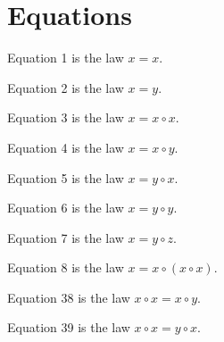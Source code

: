 \chapter{Equations}

\begin{definition}[Equation 1]\label{eq1}\leanok{}  Equation 1 is the law $x=x$.
\end{definition}

\begin{definition}[Equation 2]\label{eq2}\leanok{}  Equation 2 is the law $x=y$.
\end{definition}

\begin{definition}[Equation 3]\label{eq3}\leanok{}  Equation 3 is the law $x=x \circ x$.
\end{definition}

\begin{definition}[Equation 4]\label{eq4}\leanok{}  Equation 4 is the law $x=x \circ y$.
\end{definition}

\begin{definition}[Equation 5]\label{eq5}\leanok{}  Equation 5 is the law $x=y \circ x$.
\end{definition}

\begin{definition}[Equation 6]\label{eq6}\leanok{}  Equation 6 is the law $x=y \circ y$.
\end{definition}

\begin{definition}[Equation 7]\label{eq7}\leanok{}  Equation 7 is the law $x=y \circ z$.
\end{definition}

\begin{definition}[Equation 8]\label{eq8}\leanok{}  Equation 8 is the law $x=x \circ (x \circ x)$.
\end{definition}

\begin{definition}[Equation 38]\label{eq38}\leanok{}  Equation 38 is the law $x \circ x = x \circ y$.
\end{definition}

\begin{definition}[Equation 39]\label{eq39}\leanok{}  Equation 39 is the law $x \circ x = y \circ x$.
\end{definition}

